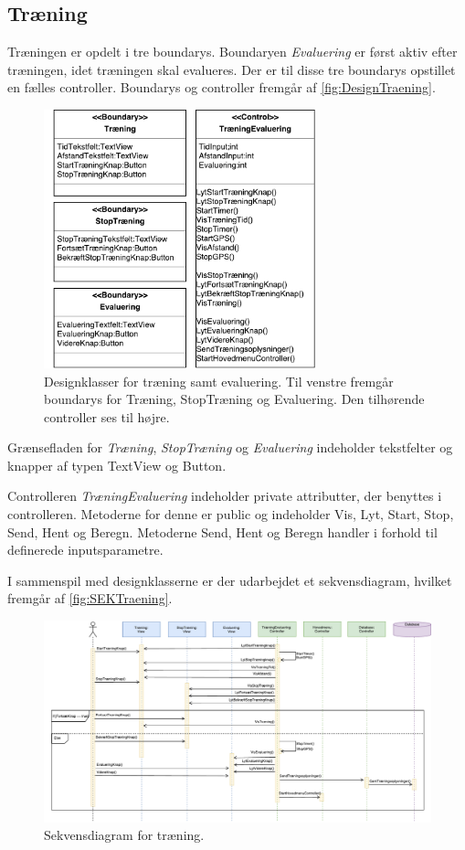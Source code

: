 \subsection*{Træning}
Træningen er opdelt i tre boundarys. Boundaryen \textit{Evaluering} er først aktiv efter træningen, idet træningen skal evalueres. Der er til disse tre boundarys opstillet en fælles controller. Boundarys og controller fremgår af \autoref{fig:DesignTraening}. 

\begin{figure} [H]
\centering
\includegraphics[width=0.7\textwidth]{figures/MVC/MVCTraening}
\caption{Designklasser for træning samt evaluering. Til venstre fremgår boundarys for Træning, StopTræning og Evaluering. Den tilhørende controller ses til højre.}
\label{fig:DesignTraening}
\end{figure}

\noindent
Grænsefladen for \textit{Træning}, \textit{StopTræning} og \textit{Evaluering} indeholder tekstfelter og knapper af typen TextView og Button. 


Controlleren \textit{TræningEvaluering} indeholder private attributter, der benyttes i controlleren. Metoderne for denne er public og indeholder Vis, Lyt, Start, Stop, Send, Hent og Beregn. Metoderne Send, Hent og Beregn handler i forhold til definerede inputsparametre.  

I sammenspil med designklasserne er der udarbejdet et sekvensdiagram, hvilket fremgår af \autoref{fig:SEKTraening}. 

\begin{figure} [H]
\centering
\includegraphics[width=1.55\textwidth, angle=90]{figures/Sek/SEKTraening}
\caption{Sekvensdiagram for træning.}
\label{fig:SEKTraening}
\end{figure}

